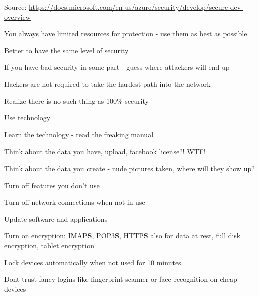 \documentclass[Screen16to9,17pt]{foils}
\begin{document}
Source:
\url{https://docs.microsoft.com/en-us/azure/security/develop/secure-dev-overview}




\begin{list1}
\item You always have limited resources for protection - use them as best as possible
\end{list1}




\begin{list1}
\item Better to have the same level of security
\item If you have bad security in some part - guess where attackers will end up
\item Hackers are not required to take the hardest path into the network
\item Realize there is no such thing as 100\% security
\end{list1}



\begin{list1}
\item Use technology
\item Learn the technology - read the freaking manual
\item Think about the data you have, upload, facebook license?! WTF!
\item Think about the data you create - nude pictures taken, where will they show up?
\begin{list2}
\item Turn off features you don't use
\item Turn off network connections when not in use
\item Update software and applications
\item Turn on encryption: IMAP{\bf S}, POP3{\bf S},
  HTTP{\bf S} also for data at rest, full disk encryption, tablet encryption
\item Lock devices automatically when not used for 10 minutes
\item Dont trust fancy logins like fingerprint scanner or face recognition on cheap devices
\end{list2}
\end{list1}
\end{document}
